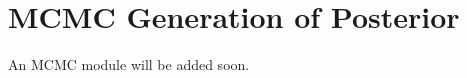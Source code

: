 \documentclass[main.tex]{subfiles}
\begin{document}
\setcounter{section}{5}
\section{MCMC Generation of Posterior}

An MCMC module will be added soon.
\end{document}
